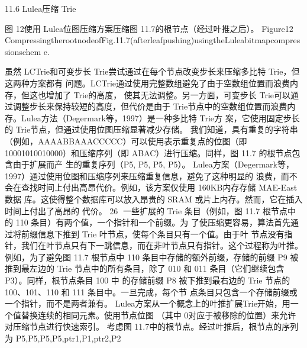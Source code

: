 11.6 Lulea压缩 Trie




           图 12使用 Lulea位图压缩方案压缩图 11.7的根节点（经过叶推之后）。
Figure12
CompressingtherootnodeofFig.11.7(afterleafpushing)usingtheLuleabitmapcompressionschem
e.

虽然 LCTrie和可变步长 Trie尝试通过在每个节点改变步长来压缩多比特 Trie，但这两种方案都有
问题。LCTrie通过使用完整数组避免了由于空数组位置而浪费内存，但这也增加了 Trie的高度，
使其无法调整。另一方面，可变步长 Trie可以通过调整步长来保持较短的高度，但代价是由于
Trie节点中的空数组位置而浪费内存。Lulea方法（Degermark等，1997）是一种多比特 Trie方
案，它使用固定步长的 Trie节点，但通过使用位图压缩显著减少存储。
我们知道，具有重复的字符串（例如，AAAABBAAACCCCC）可以使用表示重复点的位图（即
10001010010000）和压缩序列（即 ABAC）进行压缩。同样，图 11.7 的根节点包含由于扩展而产
生的重复序列（P5, P5, P5, P5）。
Lulea方案（Degermark等，1997）通过使用位图和压缩序列来压缩重复信息，避免了这种明显的
浪费，而不会在查找时间上付出高昂代价。例如，该方案仅使用 160KB内存存储 MAE-East数据
库。这使得整个数据库可以放入昂贵的 SRAM 或片上内存。然而，它在插入时间上付出了高昂的
代价。
                                                                                   26
一些扩展的 Trie 条目（例如，图 11.7 根节点中的 110 条目）有两个值，一个指针和一个前缀。为
了使压缩更容易，算法首先通过将前缀信息下推到 Trie 叶节点，使每个条目只有一个值。由于叶
节点没有指针，我们在叶节点只有下一跳信息，而在非叶节点只有指针。这个过程称为叶推。
例如，为了避免图 11.7 根节点中 110 条目中存储的额外前缀，存储的前缀 P9 被推到最左边的
Trie 节点中的所有条目，除了 010 和 011 条目（它们继续包含 P3）。同样，根节点条目 100 中
的存储前缀 P8 被下推到最右边的 Trie 节点的 100、101、110 和 111 条目中。一旦完成，每个节
点条目只包含一个存储前缀或一个指针，而不是两者兼有。
Lulea方案从一个概念上的叶推扩展Trie开始，用一个值替换连续的相同元素。使用节点位图
（其中 0对应于被移除的位置）来允许对压缩节点进行快速索引。
考虑图 11.7中的根节点。经过叶推后，根节点的序列为 P5,P5,P5,P5,ptr1,P1,ptr2,P2



